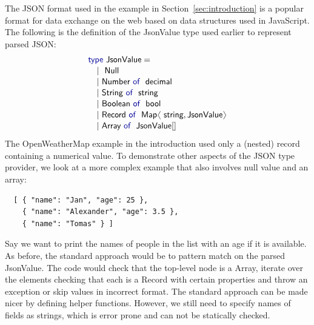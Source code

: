 \documentclass[10pt,preprint,clearpagebib]{sigplanconf}
\newcommand{\langl}{\begin{picture}(4.5,7)
\put(1.1,2.5){\rotatebox{60}{\line(1,0){5.5}}}
\put(1.1,2.5){\rotatebox{300}{\line(1,0){5.5}}}
\end{picture}}
\newcommand{\rangl}{\begin{picture}(4.5,7)
\put(.9,2.5){\rotatebox{120}{\line(1,0){5.5}}}
\put(.9,2.5){\rotatebox{240}{\line(1,0){5.5}}}
\end{picture}}
\newcommand{\kvd}[1]{\textnormal{\textcolor{kvdclr}{\sffamily #1}}}
\newcommand{\ident}[1]{\textnormal{\sffamily #1}}
\begin{document}
The JSON format used in the example in Section~\ref{sec:introduction} is a popular format for data
exchange on the web based on data structures used in JavaScript. The following is the definition 
of the \ident{JsonValue} type used earlier to represent parsed JSON:
%
\begin{equation*}
\begin{array}{l}
 \kvd{type}~\ident{JsonValue} = \\[0.1em]
 \quad|~\ident{Null} \\[0.1em]
 \quad|~\ident{Number}~\kvd{of}~\ident{decimal} \\[0.1em]
 \quad|~\ident{String}~\kvd{of}~\ident{string} \\[0.1em]
 \quad|~\ident{Boolean}~\kvd{of}~\ident{bool} \\[0.1em]
 \quad|~\ident{Record}~\kvd{of}~\ident{Map}\langl\ident{string}, \ident{JsonValue}\rangl \\[0.1em]
 \quad|~\ident{Array}~\kvd{of}~\ident{JsonValue}[] \\[0.1em]
\end{array}
\end{equation*}
%
The OpenWeatherMap example in the introduction used only a (nested) record containing a numerical
value. To demonstrate other aspects of the JSON type provider, we look at a more complex example
that also involves \kvd{null} value and an array:
%
{\small{
\begin{verbatim}
  [ { "name": "Jan", "age": 25 },
    { "name": "Alexander", "age": 3.5 },
    { "name": "Tomas" } ]
\end{verbatim}
}}
%
\noindent
Say we want to print the names of people in the list with an age if it is available. As before, 
the standard approach would be to pattern match on the parsed \ident{JsonValue}. The code would 
check that the top-level node is a \ident{Array}, iterate over the elements checking that each is
a \ident{Record} with certain properties and throw an exception or skip values in incorrect format.
The standard approach can be made nicer by defining helper functions. However, we still need to
specify names of fields as strings, which is error prone and can not be statically checked.
\end{document}
